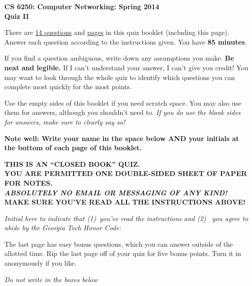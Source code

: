 \documentclass[11pt]{article}
\begin{document}
\begin{center}
{\Large{\bf CS 6250: Computer Networking: Spring 2014} \\
 \vspace{.15in} \Huge{\bf Quiz II}} 

\begin{boxedminipage}[h]{6in}
There are \underline{14 questions} and \underline{\pageref{lastpage}
  pages} in this quiz booklet (including this page).  Answer each
question according to the instructions given.  You have {\bf 85
  minutes}.



\vspace{.1in} 
If you find a question ambiguous, write down any
assumptions you make.  {\bf Be neat and legible.}  If I can't
understand your answer, I can't give you credit!  You may want to look
through the whole quiz to identify which questions you can complete most
quickly for the most points.

\vspace{.1in} 
Use the empty sides of this booklet if you need scratch space.  You
may also use them for answers, although you shouldn't need to.  {\em If you
do use the blank sides for answers, make sure to clearly say so!}

\vspace{.1in} 
{\bf Note well: Write your name in the space below AND your initials at the bottom of each
page of this booklet.}

\begin{center}{\bf THIS IS AN ``CLOSED BOOK'' QUIZ.\\
YOU ARE PERMITTED ONE DOUBLE-SIDED SHEET OF PAPER FOR NOTES.\\
{\em ABSOLUTELY NO EMAIL OR MESSAGING OF ANY KIND!} \\
MAKE SURE YOU'VE READ ALL THE INSTRUCTIONS ABOVE!}
\end{center}
{\em Initial here to indicate that (1)~you've read the instructions and (2)~
you agree to abide by the Georgia Tech Honor Code: }

\vspace{.1in} The last page has easy bonus questions, which you can
answer outside of the allotted time.  Rip the last page off of your
quiz for five bonus points.  Turn it in anonymously if you like.

\end{boxedminipage}
\end{center}
\vspace*{0.25in}
\begin{center}
{\it Do not write in the boxes below}
\end{center}
\end{document}
